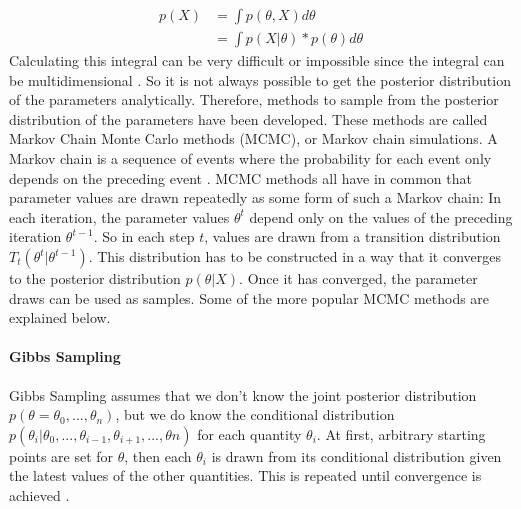 \documentclass{article}
\begin{document}
\begin{equation}
\begin{split}
p(X) &= \int p(\theta,X) d \theta \\
&=  \int p(X|\theta) * p(\theta) d \theta
\end{split}
\end{equation}
Calculating this integral can be very difficult or impossible since the integral can be multidimensional \cite{1439840954}. So it is not always possible to get the posterior distribution of the parameters analytically. Therefore, methods to sample from the posterior distribution of the parameters have been developed. These methods are called Markov Chain Monte Carlo methods (MCMC), or Markov chain simulations. A Markov chain is a sequence of events where the probability for each event only depends on the preceding event \cite{Oxforddictionaries}. MCMC methods all have in common that parameter values are drawn repeatedly as some form of such a Markov chain: In each iteration, the parameter values $\theta^t$ depend only on the values of the preceding iteration $\theta^{t-1}$. So in each step $t$, values are drawn from a transition distribution $T_t(\theta^t|\theta^{t-1})$. This distribution has to be constructed in a way that it converges to the posterior distribution $p(\theta|X)$. Once it has converged, the parameter draws can be used as samples. Some of the more popular MCMC methods are explained below.
\paragraph{Gibbs Sampling}
Gibbs Sampling assumes that we don't know the joint posterior distribution $p(\theta = \theta_0,...,\theta_n)$, but we do know the conditional distribution $p(\theta_i | \theta_0,...,\theta_{i-1},\theta_{i+1},...,\theta{n} )$ for each quantity $\theta_i$. At first, arbitrary starting points are set for $\theta$, then each $\theta_i$ is drawn from its conditional distribution given the latest values of the other quantities. This is repeated until convergence is achieved
\cite{Martz1994}.
\end{document}
